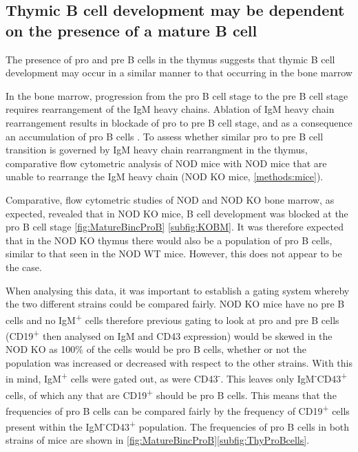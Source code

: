 \subsection{Thymic B cell development may be dependent on the presence of a mature B cell}

The presence of pro and pre B cells in the thymus suggests that thymic B cell development may occur in a similar manner to that occurring in the bone marrow

In the bone marrow, progression from the pro B cell stage to the pre B cell stage requires rearrangement of the IgM heavy chains.
Ablation of IgM heavy chain rearrangement results in blockade of pro to pre B cell stage, and as a consequence an accumulation of pro B cells .
To assess whether similar pro to pre B cell transition is governed by IgM heavy chain rearrangment in the thymus, comparative flow cytometric analysis of NOD mice with NOD mice that are unable to rearrange the IgM heavy chain (NOD KO mice, \cref{methods:mice}). 

Comparative, flow cytometric studies of NOD and NOD KO bone marrow, as expected, revealed that in NOD KO mice, B cell development was blocked at the pro B cell stage \cref{fig:MatureBincProB} \ref{subfig:KOBM}.
It was therefore expected that in the NOD KO thymus there would also be a population of pro B cells, similar to that seen in the NOD WT mice. 
However, this does not appear to be the case.

When analysing this data, it was important to establish a gating system whereby the two different strains could be compared fairly.
NOD KO mice have no pre B cells and no IgM\textsuperscript{+} cells therefore previous gating to look at pro and pre B cells (CD19\textsuperscript{+} then analysed on IgM and CD43 expression) would be skewed in the NOD KO as 100\% of the cells would be pro B cells, whether or not the population was increased or decreased with respect to the other strains.
With this in mind, IgM\textsuperscript{+} cells were gated out, as were CD43\textsuperscript{-}.
This leaves only IgM\textsuperscript{-}CD43\textsuperscript{+} cells, of which any that are CD19\textsuperscript{+} should be pro B cells.
This means that the frequencies of pro B cells can be compared fairly by the frequency of CD19\textsuperscript{+} cells present within the IgM\textsuperscript{-}CD43\textsuperscript{+} population.
The frequencies of pro B cells in both strains of mice are shown in \cref{fig:MatureBincProB}\ref{subfig:ThyProBcells}.


